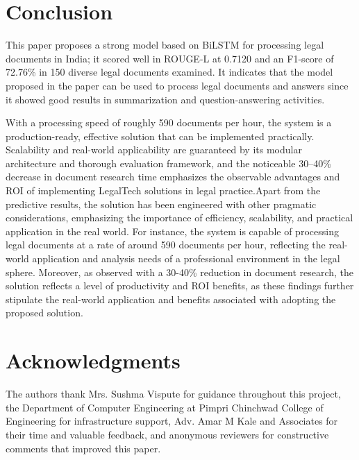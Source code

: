 \documentclass{llncs}
\begin{document}
\section{Conclusion }
This paper proposes a strong model based on BiLSTM for processing legal documents in India; it scored well in ROUGE-L at 0.7120 and an F1-score of 72.76\% in 150 diverse legal documents examined. It indicates that the model proposed in the paper can be used to process legal documents and answers since it showed good results in summarization and question-answering activities.


With a processing speed of roughly 590 documents per hour, the system is a production-ready, effective solution that can be implemented practically. Scalability and real-world applicability are guaranteed by its modular architecture and thorough evaluation framework, and the noticeable 30–40\% decrease in document research time emphasizes the observable advantages and ROI of implementing LegalTech solutions in legal practice.Apart from the predictive results, the solution has been engineered with other pragmatic considerations, emphasizing the importance of efficiency, scalability, and practical application in the real world. For instance, the system is capable of processing legal documents at a rate of around 590 documents per hour, reflecting the real-world application and analysis needs of a professional environment in the legal sphere. Moreover, as observed with a 30-40\% reduction in document research, the solution reflects a level of productivity and ROI benefits, as these findings further stipulate the real-world application and benefits associated with adopting the proposed solution.


\section*{Acknowledgments}

The authors thank Mrs. Sushma Vispute for guidance throughout this project, the Department of Computer Engineering at Pimpri Chinchwad College of Engineering for infrastructure support, Adv. Amar M Kale and Associates for their time and valuable feedback, and anonymous reviewers for constructive comments that improved this paper.
\end{document}
